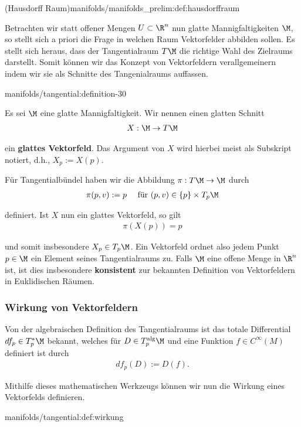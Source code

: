 \documentclass[letterpaper,10pt,english]{jupyterBook}
\begin{document}
\begin{definition}{(Hausdorff Raum)}{manifolds/manifolds_prelim:def:hausdorffraum}
\par
Betrachten wir statt offener Mengen \(U\subset\R^n\) nun glatte Mannigfaltigkeiten \(\M\), so stellt sich a priori die Frage in welchen Raum Vektorfelder abbilden sollen.
Es stellt sich heraus, dass der Tangentialraum \(T\M\) die richtige Wahl des Zielraums darstellt.
Somit können wir das Konzept von Vektorfeldern verallgemeinern indem wir sie als Schnitte des Tangenialraums auffassen.
\begin{definition}{}{manifolds/tangential:definition-30}



\par
Es sei \(\M\) eine glatte Mannigfaltigkeit.
Wir nennen einen glatten Schnitt
\begin{align*}
X:\M\to T\M
\end{align*}
\par
ein \textbf{glattes Vektorfeld}.
Das Argument von \(X\) wird hierbei meist als Subskript notiert, d.h., \(X_p := X(p)\).
\end{definition}

\par
Für Tangentialbündel haben wir die Abbildung \(\pi:T\M\to\M\) durch
\begin{align*}
\pi(p,v):= p\quad\text{ für } (p,v)\in\{p\}\times T_p\M
\end{align*}
\par
definiert.
Ist \(X\) nun ein glattes Vektorfeld, so gilt
\begin{align*}
\pi(X(p)) = p
\end{align*}
\par
und somit insbesondere \(X_p\in T_p\M\).
Ein Vektorfeld ordnet also jedem Punkt \(p\in\M\) ein Element seines Tangentialraums zu.
Falls \(\M\) eine offene Menge in \(\R^n\) ist, ist dies insbesondere \textbf{konsistent} zur bekannten Definition von Vektorfeldern in Euklidischen Räumen.


\subsubsection{Wirkung von Vektorfeldern}
\label{\detokenize{manifolds/tangential:wirkung-von-vektorfeldern}}
\par
Von der algebraischen Definition des Tangentialraums ist das totale Differential \(df_p\in T^\ast_p\M\) bekannt, welches für \(D\in T^{\text{alg}}_p\M\) und eine Funktion \(f\in C^\infty(M)\) definiert ist durch
\begin{align*}
df_p(D):= D(f).
\end{align*}
\par
Mithilfe dieses mathematischen Werkzeugs können wir nun die Wirkung eines Vektorfelds definieren.
\begin{definition}{}{manifolds/tangential:def:wirkung}




\end{definition}
\end{definition}
\end{document}

